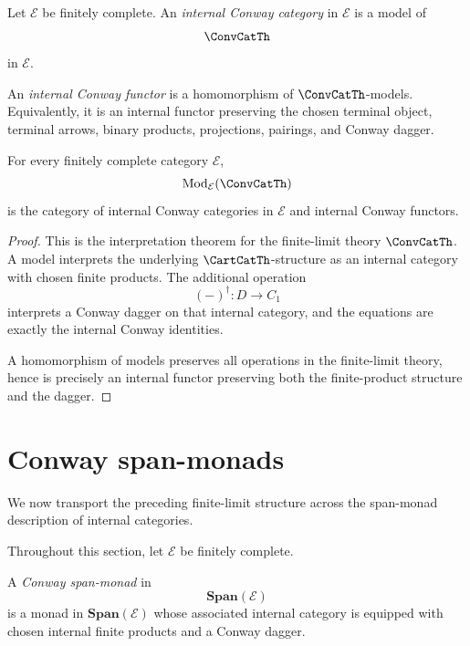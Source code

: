 \begin{definition}
\label{def:internal-conway-category}
Let \(\mathcal E\) be finitely complete.  An \emph{internal Conway category}
in \(\mathcal E\) is a model of
\[
\ConvCatTh
\]
in \(\mathcal E\).
\end{definition}

\begin{definition}
\label{def:internal-conway-functor}
An \emph{internal Conway functor} is a homomorphism of
\(\ConvCatTh\)-models.  Equivalently, it is an internal functor preserving the
chosen terminal object, terminal arrows, binary products, projections,
pairings, and Conway dagger.
\end{definition}

\begin{proposition}
\label{prop:models-convcatth}
For every finitely complete category \(\mathcal E\),
\[
\operatorname{Mod}_{\mathcal E}(\ConvCatTh)
\]
is the category of internal Conway categories in \(\mathcal E\) and internal
Conway functors.
\end{proposition}

\begin{proof}
This is the interpretation theorem for the finite-limit theory
\(\ConvCatTh\).  A model interprets the underlying \(\CartCatTh\)-structure as
an internal category with chosen finite products.  The additional operation
\[
(-)^\dagger:D\to C_1
\]
interprets a Conway dagger on that internal category, and the equations are
exactly the internal Conway identities.

A homomorphism of models preserves all operations in the finite-limit theory,
hence is precisely an internal functor preserving both the finite-product
structure and the dagger.
\end{proof}

\section{Conway span-monads}
\label{sec:conway-span-monads}

We now transport the preceding finite-limit structure across the span-monad
description of internal categories.

Throughout this section, let \(\mathcal E\) be finitely complete.

\begin{definition}
\label{def:conway-span-monad}
A \emph{Conway span-monad} in
\[
\mathbf{Span}(\mathcal E)
\]
is a monad in \(\mathbf{Span}(\mathcal E)\) whose associated internal category
is equipped with chosen internal finite products and a Conway dagger.
\end{definition}

